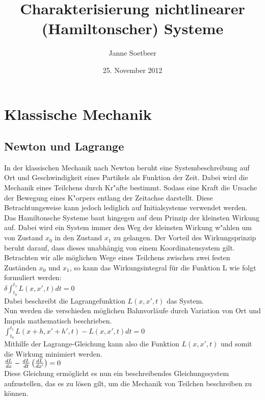 \documentclass[]{article}
\begin{document}
\title{Charakterisierung nichtlinearer (Hamiltonscher) Systeme}
\author{Janne Soetbeer}
\date{25. November 2012}
\maketitle
\newpage
\section{Klassische Mechanik}
\subsection{Newton und Lagrange}
In der klassischen Mechanik nach Newton beruht eine Systembeschreibung auf Ort und Geschwindigkeit eines Partikels als Funktion der Zeit. Dabei wird die Mechanik eines Teilchens durch Kr"afte bestimmt. Sodass eine Kraft die Ursache der Bewegung eines K"orpers entlang der Zeitachse darstellt. Diese Betrachtungsweise kann jedoch lediglich auf Initialsysteme verwendet werden. 
\\
Das Hamiltonsche Systeme baut hingegen auf dem Prinzip der kleinsten Wirkung auf. Dabei wird ein System immer den Weg der kleinsten Wirkung w"ahlen um von Zustand $x_0$ in den Zustand $x_1$ zu gelangen. Der Vorteil des Wirkungsprinzip beruht darauf, dass dieses unabhängig von einem Koordinatensystem gilt.
\\
Betrachten wir alle möglichen Wege eines Teilchens zwischen zwei festen Zuständen $x_0$ und $x_1$, so kann das Wirkungsintegral für die Funktion L wie folgt formuliert werden: 
\\
\newline
$\delta\int_{t_0}^{t_1} L(x,x',t) dt = 0$ \\
\newline
Dabei beschreibt die Lagrangefunktion $L(x,x',t)$ das System. \\
Nun werden die verschieden möglichen Bahnvorläufe durch Variation von Ort und Impuls mathematisch beschrieben.  
\newline
\\
$\int_{t_0}^{t_1} L(x+h,x'+h',t)-L(x, x', t) dt = 0$
\\
\newline
Mithilfe der Lagrange-Gleichung kann also die Funktion $L(x,x',t)$ und somit die Wirkung minimiert werden. 
\newline
\\
$\frac{dL}{dx} - \frac{dL}{dt} \left(\frac{dL}{dx`}\right)= 0 $
\\
\newline
Diese Gleichung ermöglicht es nun ein beschreibendes Gleichungssystem aufzustellen, das es zu lösen gilt, um die Mechanik von Teilchen beschreiben zu können. 
\\
\newline
\end{document}
